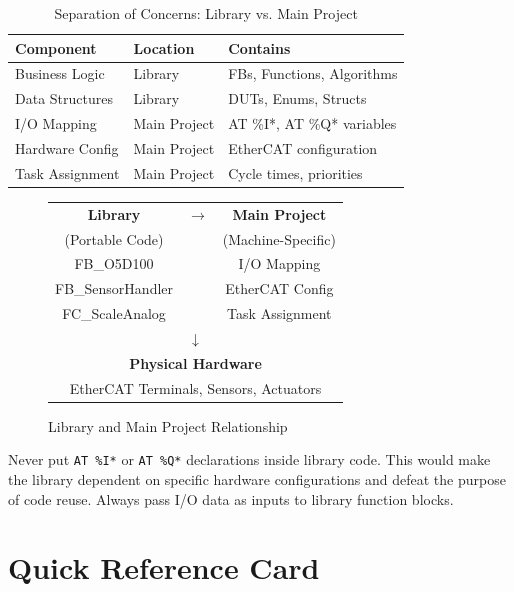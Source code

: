\documentclass[11pt,a4paper]{article}
\begin{document}
\begin{table}[h]
\centering
\begin{tabular}{@{}lll@{}}
\toprule
\textbf{Component} & \textbf{Location} & \textbf{Contains} \\
\midrule
Business Logic & Library & FBs, Functions, Algorithms \\
Data Structures & Library & DUTs, Enums, Structs \\
I/O Mapping & Main Project & AT \%I*, AT \%Q* variables \\
Hardware Config & Main Project & EtherCAT configuration \\
Task Assignment & Main Project & Cycle times, priorities \\
\bottomrule
\end{tabular}
\caption{Separation of Concerns: Library vs. Main Project}
\end{table}

\begin{figure}[h]
\centering
\begin{tabular}{|c|c|c|}
\hline
\textbf{Library} & $\rightarrow$ & \textbf{Main Project} \\
(Portable Code) & & (Machine-Specific) \\
\hline
FB\_O5D100 & & I/O Mapping \\
FB\_SensorHandler & & EtherCAT Config \\
FC\_ScaleAnalog & & Task Assignment \\
\hline
\multicolumn{3}{|c|}{$\downarrow$} \\
\hline
\multicolumn{3}{|c|}{\textbf{Physical Hardware}} \\
\multicolumn{3}{|c|}{EtherCAT Terminals, Sensors, Actuators} \\
\hline
\end{tabular}
\caption{Library and Main Project Relationship}
\end{figure}

\begin{warningbox}
Never put \texttt{AT \%I*} or \texttt{AT \%Q*} declarations inside library code. This would make the library dependent on specific hardware configurations and defeat the purpose of code reuse. Always pass I/O data as inputs to library function blocks.
\end{warningbox}

\section*{Quick Reference Card}
\end{document}
